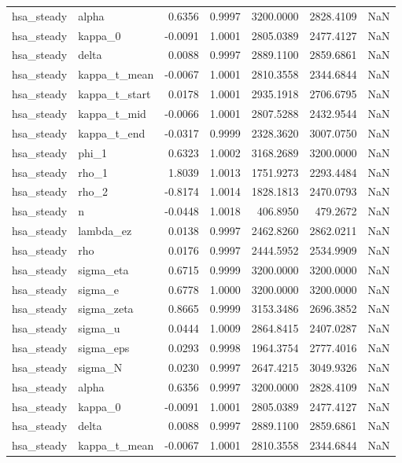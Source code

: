 \begin{tabular}{llrrrrl}
hsa\_steady & alpha & 0.6356 & 0.9997 & 3200.0000 & 2828.4109 & NaN \\
hsa\_steady & kappa\_0 & -0.0091 & 1.0001 & 2805.0389 & 2477.4127 & NaN \\
hsa\_steady & delta & 0.0088 & 0.9997 & 2889.1100 & 2859.6861 & NaN \\
hsa\_steady & kappa\_t\_mean & -0.0067 & 1.0001 & 2810.3558 & 2344.6844 & NaN \\
hsa\_steady & kappa\_t\_start & 0.0178 & 1.0001 & 2935.1918 & 2706.6795 & NaN \\
hsa\_steady & kappa\_t\_mid & -0.0066 & 1.0001 & 2807.5288 & 2432.9544 & NaN \\
hsa\_steady & kappa\_t\_end & -0.0317 & 0.9999 & 2328.3620 & 3007.0750 & NaN \\
hsa\_steady & phi\_1 & 0.6323 & 1.0002 & 3168.2689 & 3200.0000 & NaN \\
hsa\_steady & rho\_1 & 1.8039 & 1.0013 & 1751.9273 & 2293.4484 & NaN \\
hsa\_steady & rho\_2 & -0.8174 & 1.0014 & 1828.1813 & 2470.0793 & NaN \\
hsa\_steady & n & -0.0448 & 1.0018 & 406.8950 & 479.2672 & NaN \\
hsa\_steady & lambda\_ez & 0.0138 & 0.9997 & 2462.8260 & 2862.0211 & NaN \\
hsa\_steady & rho & 0.0176 & 0.9997 & 2444.5952 & 2534.9909 & NaN \\
hsa\_steady & sigma\_eta & 0.6715 & 0.9999 & 3200.0000 & 3200.0000 & NaN \\
hsa\_steady & sigma\_e & 0.6778 & 1.0000 & 3200.0000 & 3200.0000 & NaN \\
hsa\_steady & sigma\_zeta & 0.8665 & 0.9999 & 3153.3486 & 2696.3852 & NaN \\
hsa\_steady & sigma\_u & 0.0444 & 1.0009 & 2864.8415 & 2407.0287 & NaN \\
hsa\_steady & sigma\_eps & 0.0293 & 0.9998 & 1964.3754 & 2777.4016 & NaN \\
hsa\_steady & sigma\_N & 0.0230 & 0.9997 & 2647.4215 & 3049.9326 & NaN \\
hsa\_steady & alpha & 0.6356 & 0.9997 & 3200.0000 & 2828.4109 & NaN \\
hsa\_steady & kappa\_0 & -0.0091 & 1.0001 & 2805.0389 & 2477.4127 & NaN \\
hsa\_steady & delta & 0.0088 & 0.9997 & 2889.1100 & 2859.6861 & NaN \\
hsa\_steady & kappa\_t\_mean & -0.0067 & 1.0001 & 2810.3558 & 2344.6844 & NaN \\

\end{tabular}
